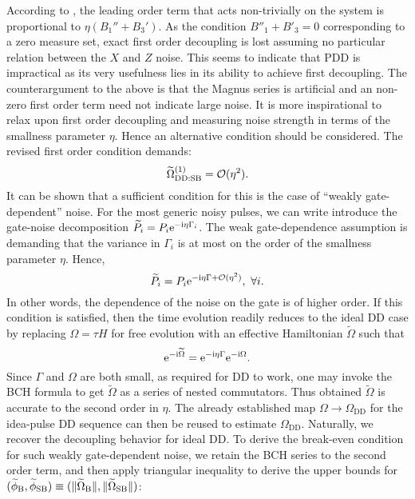 \documentclass[pra,reprint,superscriptaddress]{revtex4-2}
\newcommand{\wt}[1]{\widetilde{#1}}
\newcommand{\rDD}{\mathrm{DD}}
\begin{document}
According to , the leading order term that acts non-trivially on the system is proportional to $\eta(B_1''+B_3')$. 
As the condition $B''_1+B'_3=0$ corresponding to a zero measure set, exact first order decoupling is lost assuming no particular relation between the $X$ and $Z$ noise. 
This seems to indicate that PDD is impractical as its very usefulness lies in its ability to achieve first decoupling. 
The counterargument to the above is that the Magnus series is artificial and an non-zero 
first order term need not indicate large noise. It is more inspirational to relax upon first order decoupling and measuring noise strength in terms of the smallness parameter $\eta$.  Hence an alternative condition should be 
considered. The revised first order condition demands:
\begin{equation}
 \wt\Omega_{\rDD:\rSB}\up{1} = \cO(\eta^2).
\end{equation}
It can be shown that a sufficient condition for this is the case of ``weakly gate-dependent'' noise.
For the most generic noisy pulses, we can write introduce the gate-noise decomposition $\wt{P}_i = P_i \upe^{-\upi \eta \Gamma_i}$. The weak gate-dependence assumption is demanding that the variance in $\Gamma_i$  
is at most on the order of the smallness parameter $\eta$. Hence, 
\begin{equation}\label{eq:gateindep1}
 \wt{P}_i = P_i \upe^{-\upi \eta \Gamma + \cO(\eta^2)},\ \forall i.
\end{equation}
In other words, the dependence of the noise on the gate is of higher order. If this condition is 
 satisfied, then the time evolution readily reduces to the ideal DD case by replacing $\Omega=\tau H$ for free evolution with an effective Hamiltonian $\wt{\Omega}$ such that
\begin{equation}
\upe^{-\upi \wt{\Omega}}=\upe^{-\upi \eta \Gamma}\upe^{-\upi \Omega}.
\end{equation}
Since $\Gamma$ and $\Omega$ are both small, as required for DD to work,
one may invoke the BCH formula to get $\wt{\Omega}$ as a series of nested commutators. 
Thus obtained $\wt \Omega$ is accurate to the second order in $\eta$.
The already established map $\Omega\to \Omega_{\rDD}$ for the idea-pulse DD sequence can then be reused to estimate $\Omega_{\rDD}$.
Naturally, we recover the decoupling behavior for ideal DD. To derive the break-even condition for such weakly gate-dependent noise, 
we retain the BCH series to the second order term, and then apply triangular inequality to derive the upper bounds for $(\widetilde\phi_\rB,\widetilde{\phi}_\rSB) \equiv( \norm{\wt{\Omega}_\rB}, \norm{\wt{\Omega}_\rSB})$:
\end{document}
